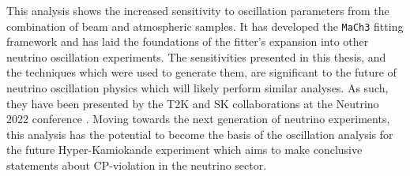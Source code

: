 This analysis shows the increased sensitivity to oscillation parameters from the combination of beam and atmospheric samples. It has developed the \texttt{MaCh3} fitting framework and has laid the foundations of the fitter's expansion into other neutrino oscillation experiments. The sensitivities presented in this thesis, and the techniques which were used to generate them, are significant to the future of neutrino oscillation physics which will likely perform similar analyses. As such, they have been presented by the T2K and SK collaborations at the Neutrino 2022 conference \cite{Bronner2022-wd}. Moving towards the next generation of neutrino experiments, this analysis has the potential to become the basis of the oscillation analysis for the future Hyper-Kamiokande experiment which aims to make conclusive statements about CP-violation in the neutrino sector.



